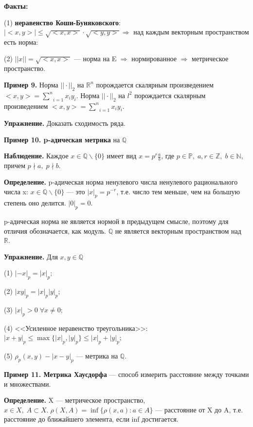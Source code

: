 \documentclass[12pt,a4paper]{article}
\begin{document}
\textbf{Факты:}

(1) \textbf{неравенство Коши-Буняковского}: $|\!\!<\!\!x, y \!\!>\!\!| \leq \sqrt{<\!\!x, x\!\!>} \cdot \sqrt{<\!\!y, y\!\!>} \Rightarrow$ над каждым векторным пространством есть норма: 

(2) $||x|| = \sqrt{<\!\!x, x\!\!>}$ --- норма на E $\Rightarrow$ нормированное $\Rightarrow$ метрическое пространство. 

\textbf{Пример 9.} Норма $|| \cdot ||_{2}$ на $\mathbb{R}^n$ порождается скалярным произведением $<\!\!x, y\!\!> = \underset{i = 1}{\overset{n}{\sum}}x_{i}y_{i}$. Норма $|| \cdot ||_{2}$ на $l^{2}$ порождается скалярным произведением $<\!\!x, y \!\!> = \underset{i = 1}{\overset{n}{\sum}} x_{i}y_{i}$. 

\textbf{Упражнение.} Доказать сходимость ряда. 

\textbf{Пример 10. p-адическая метрика} на $\mathbb{Q}$

\textbf{Наблюдение.} Каждое $x \in \mathbb{Q} \backslash \{0\}$ имеет вид $x = p^{r}\frac{a}{b}$, где $p \in \mathbb{P}, \; a, r \in \mathbb{Z}, \; b \in \mathbb{N}$, причем $p \nmid a, \; p \nmid b.$

\textbf{Определение.} p-адическая норма ненулевого числа ненулевого рационального числа x: $x \in \mathbb{Q} \backslash \{0\}$ --- это $|x|_{p} = p^{-r}$, т.е. число тем меньше, чем на большую степень оно делится. $|0|_{p} = 0$.  

p-адическая норма не является нормой в предыдущем смысле, поэтому для отличия обозначается, как модуль. $\mathbb{Q}$ не является векторным пространством над $\mathbb{R}.$ 

\textbf{Упражнение.} Для $x, y \in \mathbb{Q}$

(1) $|-x|_{p} = |x|_{p};$

(2) $|xy|_{p} = |x|_{p}|y|_{p};$

(3) $|x|_{p} > 0 \; \forall x \neq 0;$

(4) <<Усиленное неравенство треугольника>>: $|x + y|_{p} \leq \max\{|x|_{p}, |y|_{p}\} \leq |x|_{p} + |y|_{p};$

(5) $\rho_{p}(x, y) - |x - y|_{p}$ --- метрика на $\mathbb{Q}.$ 

\textbf{Пример 11. Метрика Хаусдорфа} --- способ измерить расстояние между точками и множествами.

\textbf{Определение.} X --- метрическое пространство, $x \in X, \; A \subset X. \; \rho(X, A) = \inf \{\rho(x, a): a \in A\}$ --- расстояние от X до A, т.е. расстояние до ближайшего элемента, если inf достигается. 
\end{document}
